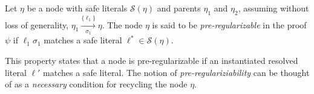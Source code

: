 

\begin{definition}
\label{prop:pair-rpi}
Let $\eta$ be a node with safe literals $\mathcal{S}(\eta)$ and parents $\eta_1$ and $\eta_2$, assuming without loss of generality, $\eta_1 \xrightarrow[\sigma_1]{\{\ell_1\} } \eta$.
The node $\eta$ is said to be \emph{pre-regularizable} in the proof $\psi$ if $\ell_1\sigma_1$ matches a safe literal $\ell^* \in \mathcal{S}(\eta)$.
\end{definition}

\noindent
This property states that a node is pre-regularizable if an instantiated resolved literal $\ell'$ matches a safe literal. The notion of \emph{pre-regulariziability} can be thought of as a \emph{necessary} condition for recycling the node $\eta$.



